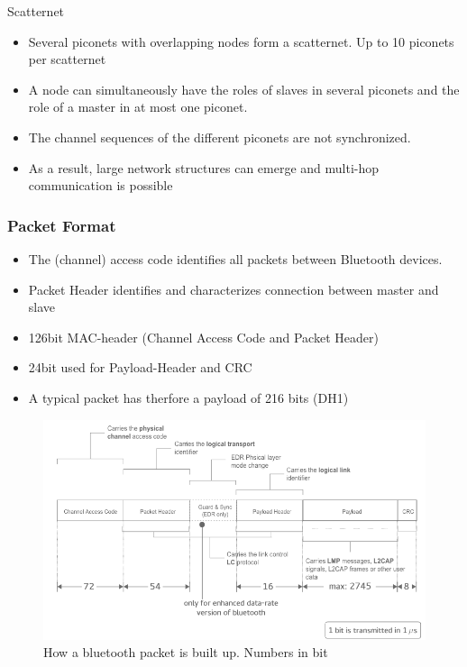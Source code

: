 Scatternet
\begin{itemize}[noitemsep]
\item Several piconets with overlapping nodes form a scatternet. Up to 10 piconets per scatternet
\item A node can simultaneously have the roles of slaves in several piconets and the role of a master in at most one piconet.
\item The channel sequences of the different piconets are not synchronized. 
\item As a result, large network structures can emerge and multi-hop communication is possible
\end{itemize}

\subsubsection{Packet Format}
\begin{itemize}[noitemsep]
\item The (channel) access code identifies all packets between Bluetooth devices.
\item Packet Header identifies and characterizes connection between master and slave
\item 126bit MAC-header (Channel Access Code and Packet Header)
\item 24bit used for Payload-Header and CRC
\item A typical packet has therfore a payload of 216 bits (DH1)
\end{itemize}


\begin{figure}[ht]
	\centering
  	\includegraphics[scale=0.4]{img/8_bluetooth_packet.png}
	\caption{How a bluetooth packet is built up. Numbers in bit}
	\label{fig_bluetooth_packet}
\end{figure}


